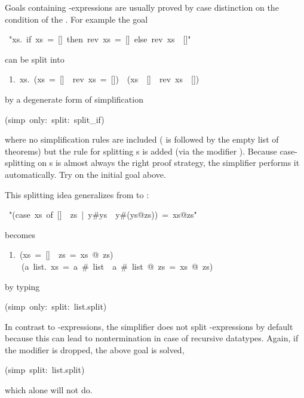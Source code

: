 \begin{isabelle}%
%
\begin{isamarkuptext}%
Goals containing -expressions are usually proved by case
distinction on the condition of the . For example the goal%
\end{isamarkuptext}%
\ {"}{\isasymforall}xs.\ if\ xs\ =\ []\ then\ rev\ xs\ =\ []\ else\ rev\ xs\ {\isasymnoteq}\ []{"}%
\begin{isamarkuptxt}%
\noindent
can be split into
\begin{isabellepar}%
~1.~{\isasymforall}xs.~(xs~=~[]~{\isasymlongrightarrow}~rev~xs~=~[])~{\isasymand}~(xs~{\isasymnoteq}~[]~{\isasymlongrightarrow}~rev~xs~{\isasymnoteq}~[])%
\end{isabellepar}%
by a degenerate form of simplification%
\end{isamarkuptxt}%
(simp\ only:\ split:\ split\_if)%
\begin{isamarkuptext}%
\noindent
where no simplification rules are included ( is followed by the
empty list of theorems) but the rule  for
splitting s is added (via the modifier ). Because
case-splitting on s is almost always the right proof strategy, the
simplifier performs it automatically. Try 
on the initial goal above.

This splitting idea generalizes from  to :%
\end{isamarkuptext}%
\ {"}(case\ xs\ of\ []\ {\isasymRightarrow}\ zs\ |\ y\#ys\ {\isasymRightarrow}\ y\#(ys@zs))\ =\ xs@zs{"}%
\begin{isamarkuptxt}%
\noindent
becomes
\begin{isabellepar}%
~1.~(xs~=~[]~{\isasymlongrightarrow}~zs~=~xs~@~zs)~{\isasymand}\isanewline
~~~~({\isasymforall}a~list.~xs~=~a~\#~list~{\isasymlongrightarrow}~a~\#~list~@~zs~=~xs~@~zs)%
\end{isabellepar}%
by typing%
\end{isamarkuptxt}%
(simp\ only:\ split:\ list.split)%
\begin{isamarkuptext}%
\noindent
In contrast to -expressions, the simplifier does not split
-expressions by default because this can lead to nontermination
in case of recursive datatypes. Again, if the  modifier is
dropped, the above goal is solved,%
\end{isamarkuptext}%
(simp\ split:\ list.split)%
\begin{isamarkuptext}%
\noindent%
which  alone will not do.


\end{isamarkuptext}
\end{isabelle}
